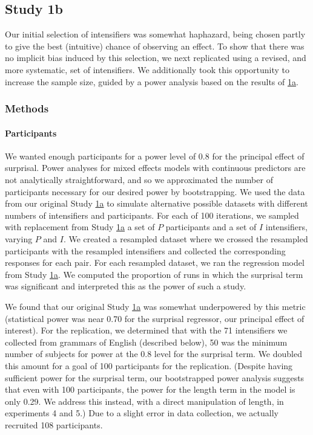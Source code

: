 \documentclass[10pt,letterpaper]{article}
\begin{document}
\subsection{Study 1b \label{sec:study1b}}

Our initial selection of intensifiers was somewhat haphazard, being chosen partly to give the best (intuitive) chance of observing an effect. 
To show that there was no implicit bias induced by this selection, we next replicated using a revised, and more systematic, set of intensifiers.
We additionally took this opportunity to increase the sample size, guided by a power analysis based on the results of \hyperref[sec:study1a]{1a}.

\subsubsection{Methods}

\paragraph{Participants}

We wanted enough participants for a power level of 0.8 for the principal effect of surprisal.
Power analyses for mixed effects models with continuous predictors are not analytically straightforward, and so we approximated the number of participants necessary for our desired power by bootstrapping.
We used the data from our original Study \hyperref[sec:study1a]{1a} to simulate alternative possible datasets with different numbers of intensifiers and participants.
For each of 100 iterations, we sampled with replacement from Study \hyperref[sec:study1a]{1a} a set of $P$ participants and a set of $I$ intensifiers, varying $P$ and $I$.
We created a resampled dataset where we crossed the resampled participants with the resampled intensifiers and collected the corresponding responses for each pair.
For each resampled dataset, we ran the regression model from Study \hyperref[sec:study1a]{1a}.
We computed the proportion of runs in which the surprisal term was significant and interpreted this as the power of such a study.

We found that our original Study \hyperref[sec:study1a]{1a} was somewhat underpowered by this metric (statistical power was near 0.70 for the surprisal regressor, our principal effect of interest).
For the replication, we determined that with the 71 intensifiers we collected from grammars of English (described below), 50 was the minimum number of subjects for power at the 0.8 level for the surprisal term.
We doubled this amount for a goal of 100 participants for the replication.
(Despite having sufficient power for the surprisal term, our bootstrapped power analysis suggests that even with 100 participants, the power for the length term in the model is only 0.29. We address this instead, with a direct manipulation of length, in experiments 4 and 5.)
Due to a slight error in data collection, we actually recruited 108 participants.
\end{document}
